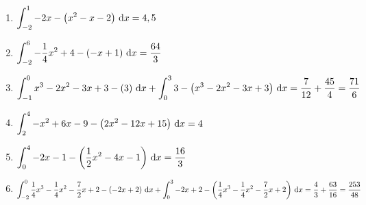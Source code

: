 \begin{Answer}[ref=flaecheZwFkt1]
	\begin{enumerate}[label=\alph*)]
		\item \(\displaystyle\int_{-2}^1 -2x-\left(x^2-x-2\right) \td x=4,5\)
		\item \(\displaystyle\int_{-2}^{6} -\frac{1}{4}x^2+4-\left(-x+1\right) \td x=\frac{64}{3}\)
		\item \(\displaystyle\int_{-1}^{0} x^3-2x^2-3x+3-\left(3\right) \td x+\int_{0}^{3} 3-\left(x^3-2x^2-3x+3\right) \td x=\frac{7}{12}+\frac{45}{4}=\frac{71}{6}\)
		\item \(\displaystyle\int_{2}^{4} -x^2+6x-9-\left(2x^2-12x+15\right) \td x=4\)
		\item \(\displaystyle\int_{0}^{4} -2x-1-\left(\frac{1}{2}x^2-4x-1\right) \td x=\frac{16}{3}\)
		\item \(\displaystyle\int_{-2}^{0} \frac{1}{4}x^3-\frac{1}{4}x^2-\frac{7}{2}x+2-\left(-2x+2\right) \td x+\int_{0}^{3} -2x+2-\left(\frac{1}{4}x^3-\frac{1}{4}x^2-\frac{7}{2}x+2\right) \td x=\frac{4}{3}+\frac{63}{16}=\frac{253}{48}\)
	\end{enumerate}
\end{Answer}